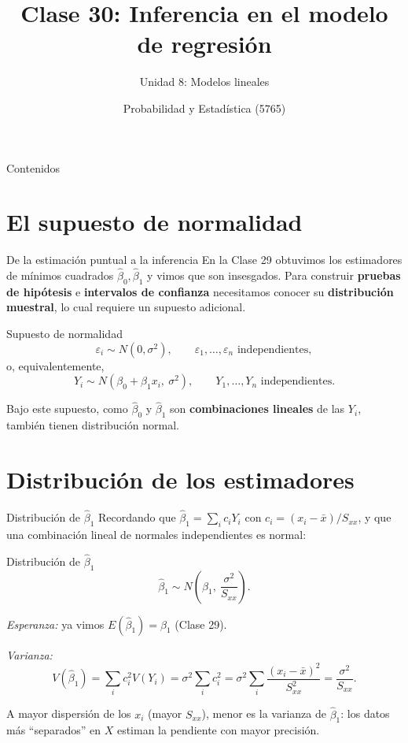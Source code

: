 \documentclass[aspectratio=169,11pt]{beamer}
\title[Prob. y Estadística]{Clase 30: Inferencia en el modelo de regresión}
\subtitle{Unidad 8: Modelos lineales}
\institute[UNS]{Universidad Nacional del Sur \\ Departamento de Matemática}
\author{Probabilidad y Estadística (5765)}
\date{}
\begin{document}
\begin{frame}
\titlepage
\end{frame}

\begin{frame}{Contenidos}
\tableofcontents
\end{frame}

\section{El supuesto de normalidad}

\begin{frame}{De la estimación puntual a la inferencia}
En la Clase 29 obtuvimos los estimadores de mínimos cuadrados $\hat\beta_0,\hat\beta_1$ y vimos que son insesgados. Para construir \textbf{pruebas de hipótesis} e \textbf{intervalos de confianza} necesitamos conocer su \textbf{distribución muestral}, lo cual requiere un supuesto adicional.

\begin{block}{Supuesto de normalidad}
\[
\varepsilon_i \sim N(0,\sigma^2), \qquad \varepsilon_1,\dots,\varepsilon_n \text{ independientes},
\]
o, equivalentemente,
\[
Y_i \sim N(\beta_0+\beta_1 x_i,\ \sigma^2), \qquad Y_1,\dots,Y_n \text{ independientes}.
\]
\end{block}

Bajo este supuesto, como $\hat\beta_0$ y $\hat\beta_1$ son \textbf{combinaciones lineales} de las $Y_i$, también tienen distribución normal.
\end{frame}

\section{Distribución de los estimadores}

\begin{frame}{Distribución de $\hat\beta_1$}
Recordando que $\hat\beta_1 = \sum_i c_i Y_i$ con $c_i=(x_i-\bar x)/S_{xx}$, y que una combinación lineal de normales independientes es normal:

\begin{block}{Distribución de $\hat\beta_1$}
\[
\hat\beta_1 \sim N\!\left(\beta_1,\ \frac{\sigma^2}{S_{xx}}\right).
\]
\end{block}

\textit{Esperanza:} ya vimos $E(\hat\beta_1)=\beta_1$ (Clase 29).

\textit{Varianza:}
\[
V(\hat\beta_1) = \sum_i c_i^2 V(Y_i) = \sigma^2 \sum_i c_i^2 = \sigma^2 \sum_i \frac{(x_i-\bar x)^2}{S_{xx}^2} = \frac{\sigma^2}{S_{xx}}.
\]

A mayor dispersión de los $x_i$ (mayor $S_{xx}$), menor es la varianza de $\hat\beta_1$: los datos más ``separados'' en $X$ estiman la pendiente con mayor precisión.
\end{frame}
\end{document}
